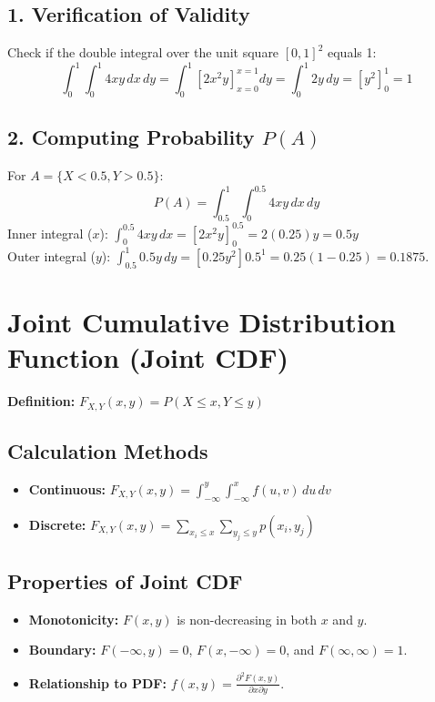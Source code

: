 \documentclass[11pt]{article}
\begin{document}
\subsection*{1. Verification of Validity}
Check if the double integral over the unit square $[0,1]^2$ equals 1:
\[ \int_{0}^{1} \int_{0}^{1} 4xy \, dx\,dy = \int_{0}^{1} \left[ 2x^2y \right]_{x=0}^{x=1} dy = \int_{0}^{1} 2y \, dy = \left[ y^2 \right]_{0}^{1} = 1 \]

\subsection*{2. Computing Probability $P(A)$}
For $A = \{X < 0.5, Y > 0.5\}$:
\[ P(A) = \int_{0.5}^{1} \int_{0}^{0.5} 4xy \, dx\,dy \]
Inner integral ($x$): $\int_{0}^{0.5} 4xy \, dx = [2x^2y]_{0}^{0.5} = 2(0.25)y = 0.5y$ \\
Outer integral ($y$): $\int_{0.5}^{1} 0.5y \, dy = [0.25y^2]{0.5}^{1} = 0.25(1 - 0.25) = 0.1875$.

\section{Joint Cumulative Distribution Function (Joint CDF)}
\textbf{Definition:} $F_{X,Y}(x, y) = P(X \le x, Y \le y)$

\subsection*{Calculation Methods}
\begin{itemize}
    \item \textbf{Continuous:} $F_{X,Y}(x, y) = \int_{-\infty}^{y} \int_{-\infty}^{x} f(u, v) \, du\,dv$
    \item \textbf{Discrete:} $F_{X,Y}(x, y) = \sum_{x_i \le x} \sum_{y_j \le y} p(x_i, y_j)$
\end{itemize}

\subsection*{Properties of Joint CDF}
\begin{itemize}
    \item \textbf{Monotonicity:} $F(x, y)$ is non-decreasing in both $x$ and $y$.
    \item \textbf{Boundary:} $F(-\infty, y) = 0$, $F(x, -\infty) = 0$, and $F(\infty, \infty) = 1$.
    \item \textbf{Relationship to PDF:} $f(x, y) = \frac{\partial^2 F(x, y)}{\partial x \partial y}$.
\end{itemize}
\end{document}
